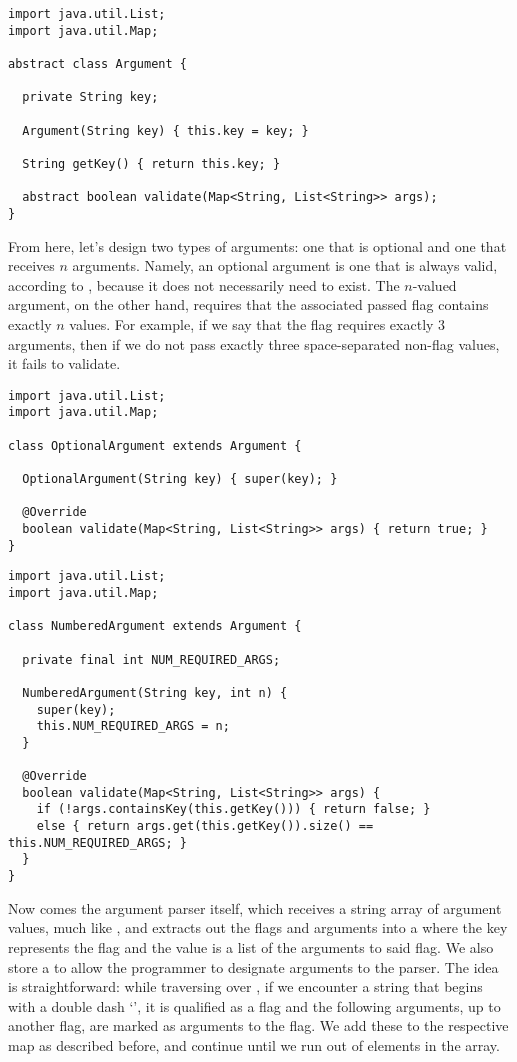 \begin{lstlisting}[language=MyJava]
import java.util.List;
import java.util.Map;

abstract class Argument {

  private String key;

  Argument(String key) { this.key = key; }

  String getKey() { return this.key; }

  abstract boolean validate(Map<String, List<String>> args);
}
\end{lstlisting}

From here, let's design two types of arguments: one that is optional and one that receives $n$ arguments. Namely, an optional argument is one that is always valid, according to , because it does not necessarily need to exist. The $n$-valued argument, on the other hand, requires that the associated passed flag contains exactly $n$ values. For example, if we say that the  flag requires exactly $3$ arguments, then if we do not pass exactly three space-separated non-flag values, it fails to validate.

\enlargethispage{-4\baselineskip}
\begin{lstlisting}[language=MyJava]
import java.util.List;
import java.util.Map;

class OptionalArgument extends Argument {

  OptionalArgument(String key) { super(key); }

  @Override
  boolean validate(Map<String, List<String>> args) { return true; }
}
\end{lstlisting}

\begin{lstlisting}[language=MyJava]
import java.util.List;
import java.util.Map;

class NumberedArgument extends Argument {

  private final int NUM_REQUIRED_ARGS;

  NumberedArgument(String key, int n) {
    super(key);
    this.NUM_REQUIRED_ARGS = n;
  }

  @Override
  boolean validate(Map<String, List<String>> args) {
    if (!args.containsKey(this.getKey())) { return false; } 
    else { return args.get(this.getKey()).size() == this.NUM_REQUIRED_ARGS; }
  }
}
\end{lstlisting}

Now comes the argument parser itself, which receives a string array of argument values, much like , and extracts out the flags and arguments into a  where the key represents the flag and the value is a list of the arguments to said flag. We also store a  to allow the programmer to designate arguments to the parser. The idea is straightforward: while traversing over , if we encounter a string that begins with a double dash `\ttt{--}', it is qualified as a flag and the following arguments, up to another flag, are marked as arguments to the flag. We add these to the respective map as described before, and continue until we run out of elements in the array.

